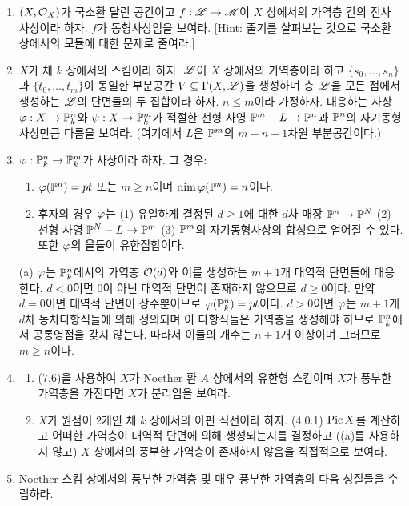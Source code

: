 	
	\begin{enumerate}[label=\tb{7.\arabic*.},itemindent=0mm,itemsep=4mm]
	\item $(X,\mathcal{O}_X)$가 국소환 달린 공간이고 $f:\mathscr{L}\rightarrow\mathscr{M}$이 $X$ 상에서의 가역층 간의 전사 사상이라 하자.
	$f$가 동형사상임을 보여라. [Hint: 줄기를 살펴보는 것으로 국소환 상에서의 모듈에 대한 문제로 줄여라.]
	\item $X$가 체 $k$ 상에서의 스킴이라 하자. $\mathscr{L}$이 $X$ 상에서의 가역층이라 하고
	$\{s_0,\ldots,s_n\}$과 $\{t_0,\ldots,t_m\}$이 동일한 부분공간 $V\subseteq\Gamma(X,\mathscr{L})$을 생성하며
	층 $\mathscr{L}$을 모든 점에서 생성하는 $\mathscr{L}$의 단면들의 두 집합이라 하자.
	$n\le m$이라 가정하자. 대응하는 사상 $\varphi:X\rightarrow\mathbb{P}^n_k$와 $\psi:X\rightarrow\mathbb{P}^m_k$가
	적절한 선형 사영 $\mathbb{P}^m-L\rightarrow\mathbb{P}^n$과 $\mathbb{P}^n$의 자기동형사상만큼 다름을 보여라.
	(여기에서 $L$은 $\mathbb{P}^m$의 $m-n-1$차원 부분공간이다.)
	\item $\varphi:\mathbb{P}^n_k\rightarrow\mathbb{P}^m_k$가 사상이라 하자. 그 경우:
	\begin{enumerate}[label=(\alph*)]
	\item $\varphi(\mathbb{P}^n)=pt$ 또는 $m\ge n$이며 $\dim\varphi(\mathbb{P}^n)=n$이다.
	\item 후자의 경우 $\varphi$는 (1) 유일하게 결정된 $d\ge 1$에 대한 $d$차 매장 $\mathbb{P}^n\rightarrow\mathbb{P}^N$
	(2) 선형 사영 $\mathbb{P}^N-L\rightarrow\mathbb{P}^m$ (3) $\mathbb{P}^m$의 자기동형사상의 합성으로 얻어질 수 있다. 또한 $\varphi$의 올들이 유한집합이다.
	\end{enumerate}
	\sol (a) $\varphi$는 $\mathbb{P}^n_k$에서의 가역층 $\mathcal{O}(d)$와 이를 생성하는 $m+1$개 대역적 단면들에 대응한다.
	$d<0$이면 0이 아닌 대역적 단면이 존재하지 않으므로 $d\ge 0$이다.
	만약 $d=0$이면 대역적 단면이 상수뿐이므로 $\varphi(\mathbb{P}^n_k)=pt$이다.
	$d>0$이면 $\varphi$는 $m+1$개 $d$차 동차다항식들에 의해 정의되며
	이 다항식들은 가역층을 생성해야 하므로 $\mathbb{P}^n_k$에서 공통영점을 갖지 않는다.
	따라서 이들의 개수는 $n+1$개 이상이며 그러므로 $m\ge n$이다.
		\item \begin{enumerate}[label=(\alph*)]
			\item (7.6)을 사용하여 $X$가 Noether 환 $A$ 상에서의 유한형 스킴이며 $X$가 풍부한 가역층을 가진다면 $X$가 분리임을 보여라.
			\item $X$가 원점이 2개인 체 $k$ 상에서의 아핀 직선이라 하자. (4.0.1)
			$\operatorname{Pic} X$를 계산하고 어떠한 가역층이 대역적 단면에 의해 생성되는지를 결정하고
			((a)를 사용하지 않고) $X$ 상에서의 풍부한 가역층이 존재하지 않음을 직접적으로 보여라.
		\end{enumerate}
		\item Noether 스킴 상에서의 풍부한 가역층 및 매우 풍부한 가역층의 다음 성질들을 수립하라.

\end{enumerate}
